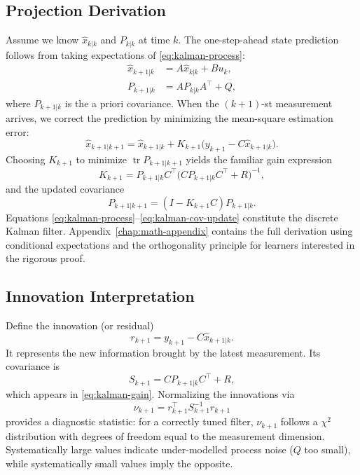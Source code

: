 \subsection{Projection Derivation}
Assume we know $\hat{x}_{k|k}$ and $P_{k|k}$ at time $k$. The one-step-ahead state prediction follows from taking expectations of \eqref{eq:kalman-process}:
\begin{align}
    \hat{x}_{k+1|k} &= A \hat{x}_{k|k} + B u_k,\\
    P_{k+1|k} &= A P_{k|k} A^\top + Q,
\end{align}
where $P_{k+1|k}$ is the a priori covariance. When the $(k+1)$-st measurement arrives, we correct the prediction by minimizing the mean-square estimation error:
\[
    \hat{x}_{k+1|k+1} = \hat{x}_{k+1|k} + K_{k+1} \bigl(y_{k+1} - C \hat{x}_{k+1|k}\bigr).
\]
Choosing $K_{k+1}$ to minimize $\operatorname{tr} P_{k+1|k+1}$ yields the familiar gain expression
\begin{equation}
    K_{k+1} = P_{k+1|k} C^\top \bigl(C P_{k+1|k} C^\top + R\bigr)^{-1}, \label{eq:kalman-gain}
\end{equation}
and the updated covariance
\begin{equation}
    P_{k+1|k+1} = (I - K_{k+1} C) P_{k+1|k}. \label{eq:kalman-cov-update}
\end{equation}
Equations \eqref{eq:kalman-process}--\eqref{eq:kalman-cov-update} constitute the discrete Kalman filter. Appendix~\ref{chap:math-appendix} contains the full derivation using conditional expectations and the orthogonality principle for learners interested in the rigorous proof.

\subsection{Innovation Interpretation}
Define the innovation (or residual)
\[
    r_{k+1} = y_{k+1} - C \hat{x}_{k+1|k}.
\]
It represents the new information brought by the latest measurement. Its covariance is
\[
    S_{k+1} = C P_{k+1|k} C^\top + R,
\]
which appears in \eqref{eq:kalman-gain}. Normalizing the innovations via
\[
    \nu_{k+1} = r_{k+1}^\top S_{k+1}^{-1} r_{k+1}
\]
provides a diagnostic statistic: for a correctly tuned filter, $\nu_{k+1}$ follows a $\chi^2$ distribution with degrees of freedom equal to the measurement dimension. Systematically large values indicate under-modelled process noise ($Q$ too small), while systematically small values imply the opposite.

